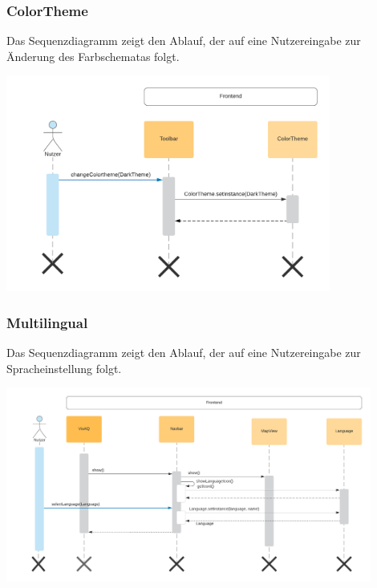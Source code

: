 \subsubsection{ColorTheme}
\label{Screenshots}
Das Sequenzdiagramm zeigt den Ablauf, der auf eine Nutzereingabe zur Änderung des Farbschematas folgt.
\begin{center}
	\includegraphics[width=0.8\textwidth]{media/frontend/sequence-diagram/sequenceColorTheme.png} 
\end{center}

\subsubsection{Multilingual}
\label{Screenshots}
Das Sequenzdiagramm zeigt den Ablauf, der auf eine Nutzereingabe zur Spracheinstellung folgt.
\begin{center}
	\includegraphics[width=0.9\textwidth]{media/frontend/sequence-diagram/sequenceMultilingual.png} 
\end{center}


